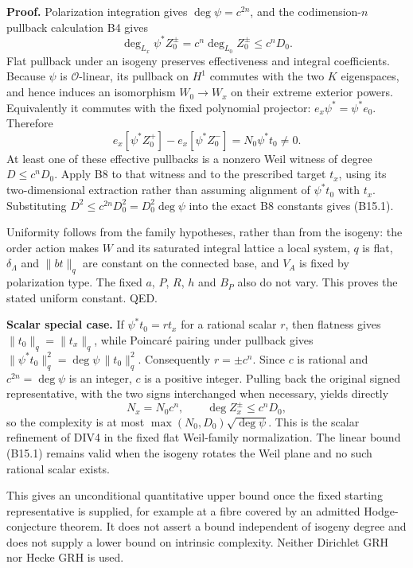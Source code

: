 \textbf{Proof.} Polarization integration gives \(\deg\psi=c^{2n}\), and the codimension-\(n\) pullback calculation B4 gives \[
 \deg_{L_x}\psi^*Z_0^\pm
 =c^n\deg_{L_0}Z_0^\pm
 \le c^nD_0.
\] Flat pullback under an isogeny preserves effectiveness and integral coefficients. Because \(\psi\) is \(\mathcal O\)-linear, its pullback on \(H^1\) commutes with the two \(K\) eigenspaces, and hence induces an isomorphism \(W_0\to W_x\) on their extreme exterior powers. Equivalently it commutes with the fixed polynomial projector: \(e_x\psi^*=\psi^*e_0\). Therefore \[
 e_x[\psi^*Z_0^+]-e_x[\psi^*Z_0^-]
 =N_0\psi^*t_0\ne0.
\] At least one of these effective pullbacks is a nonzero Weil witness of degree \(D\le c^nD_0\). Apply B8 to that witness and to the prescribed target \(t_x\), using its two-dimensional extraction rather than assuming alignment of \(\psi^*t_0\) with \(t_x\). Substituting \(D^2\le c^{2n}D_0^2=D_0^2\deg\psi\) into the exact B8 constants gives (B15.1).

Uniformity follows from the family hypotheses, rather than from the isogeny: the order action makes \(W\) and its saturated integral lattice a local system, \(q\) is flat, \(\delta_\Lambda\) and \(\|bt\|_q\) are constant on the connected base, and \(V_A\) is fixed by polarization type. The fixed \(a\), \(P\), \(R\), \(h\) and \(B_P\) also do not vary. This proves the stated uniform constant. QED.

\textbf{Scalar special case.} If \(\psi^*t_0=r t_x\) for a rational scalar \(r\), then flatness gives \(\|t_0\|_q=\|t_x\|_q\), while Poincaré pairing under pullback gives \(\|\psi^*t_0\|_q^2=\deg\psi\,\|t_0\|_q^2\). Consequently \(r=\pm c^n\). Since \(c\) is rational and \(c^{2n}=\deg\psi\) is an integer, \(c\) is a positive integer. Pulling back the original signed representative, with the two signs interchanged when necessary, yields directly \[
 N_x=N_0c^n,\qquad
 \deg Z_x^\pm\le c^nD_0,
\] so the complexity is at most \(\max(N_0,D_0)\sqrt{\deg\psi}\). This is the scalar refinement of DIV4 in the fixed flat Weil-family normalization. The linear bound (B15.1) remains valid when the isogeny rotates the Weil plane and no such rational scalar exists.

This gives an unconditional quantitative upper bound once the fixed starting representative is supplied, for example at a fibre covered by an admitted Hodge-conjecture theorem. It does not assert a bound independent of isogeny degree and does not supply a lower bound on intrinsic complexity. Neither Dirichlet GRH nor Hecke GRH is used.

